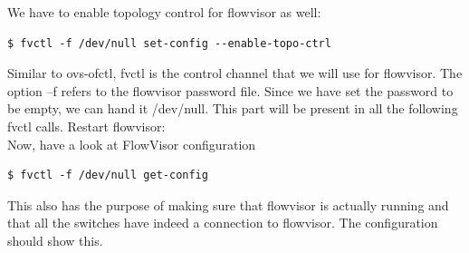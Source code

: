 \documentclass{llncs}
\begin{document}
We have to enable topology control for flowvisor as well:
\begin{lstlisting}
$ fvctl -f /dev/null set-config --enable-topo-ctrl
\end{lstlisting}

Similar to ovs-ofctl, fvctl is the control channel that we will use for 
flowvisor. The option –f refers to the flowvisor password file. Since we 
have set the password to be empty, we can hand it /dev/null. This part will 
be present in all the following fvctl calls. Restart flowvisor: \\

Now, have a look at FlowVisor configuration 

\begin{lstlisting}
$ fvctl -f /dev/null get-config
\end{lstlisting}

This also has the purpose of making sure that flowvisor is actually running 
and that all the switches have indeed a connection to flowvisor. The 
configuration should show this.
\end{document}
